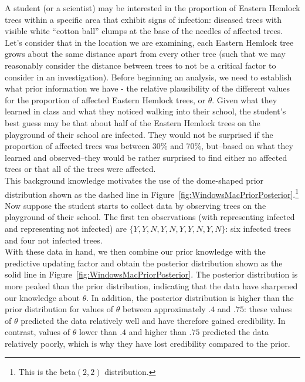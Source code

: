 \documentclass[man, floatsintext]{apa7} %
\begin{document}
A student (or a scientist) may be interested in the proportion of Eastern Hemlock trees within a specific area that exhibit signs of infection: diseased trees with visible white ``cotton ball'' clumps at the base of the needles of affected trees. Let's consider that in the location we are examining, each Eastern Hemlock tree grows about the same distance apart from every other tree (such that we may reasonably consider the distance between trees to not be a critical factor to consider in an investigation). Before beginning an analysis, we need to establish what prior information we have - the relative plausibility of the different values for the proportion of affected Eastern Hemlock trees, or $\theta$. Given what they learned in class and what they noticed walking into their school, the student's best guess may be that about half of the Eastern Hemlock trees on the playground of their school are infected. They would not be surprised if the proportion of affected trees was between 30\% and 70\%, but--based on what they learned and observed--they would be rather surprised to find either no affected trees or that all of the trees were affected. \\

This background knowledge motivates the use of the dome-shaped prior distribution shown as the dashed line in Figure~\ref{fig:WindowsMacPriorPosterior}.\footnote{This is the beta$(2,2)$ distribution.} Now suppose the student starts to collect data by observing trees on the playground of their school. The first ten observations (with  representing infected and  representing not infected) are $\{Y, Y, N, Y, N, Y, Y, N, Y, N\}$: six infected trees and four not infected trees. \\

With these data in hand, we then combine our prior knowledge with the predictive updating factor and obtain the posterior distribution shown as the solid line in Figure~\ref{fig:WindowsMacPriorPosterior}. The posterior distribution is more peaked than the prior distribution, indicating that the data have sharpened our knowledge about $\theta$. In addition, the posterior distribution is higher than the prior distribution for values of $\theta$ between approximately $.4$ and $.75$: these values of $\theta$ predicted the data relatively well and have therefore gained credibility. In contrast, values of $\theta$ lower than $.4$ and higher than $.75$ predicted the data relatively poorly, which is why they have lost credibility compared to the prior.\\ 
\end{document}
